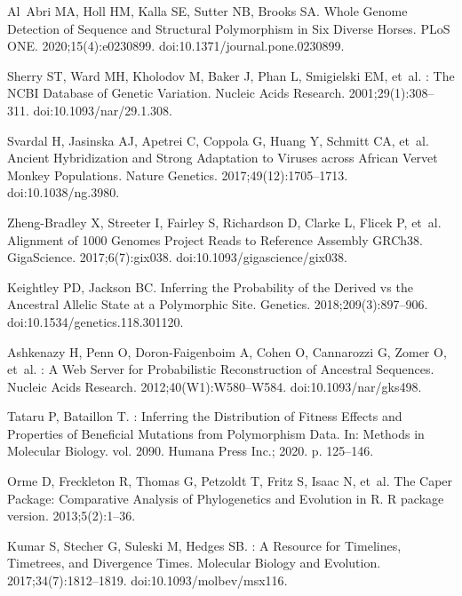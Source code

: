 \documentclass[10pt,letterpaper]{article}
\begin{document}
\begin{thebibliography}{10}
Al~Abri MA, Holl HM, Kalla SE, Sutter NB, Brooks SA.
\newblock Whole Genome Detection of Sequence and Structural Polymorphism in Six
Diverse Horses.
\newblock PLoS ONE. 2020;15(4):e0230899.
\newblock doi:{10.1371/journal.pone.0230899}.

Sherry ST, Ward MH, Kholodov M, Baker J, Phan L, Smigielski EM, et~al.
: The {{NCBI}} Database of Genetic Variation.
\newblock Nucleic Acids Research. 2001;29(1):308--311.
\newblock doi:{10.1093/nar/29.1.308}.

Svardal H, Jasinska AJ, Apetrei C, Coppola G, Huang Y, Schmitt CA, et~al.
\newblock Ancient Hybridization and Strong Adaptation to Viruses across
{{African}} Vervet Monkey Populations.
\newblock Nature Genetics. 2017;49(12):1705--1713.
\newblock doi:{10.1038/ng.3980}.

{Zheng-Bradley} X, Streeter I, Fairley S, Richardson D, Clarke L, Flicek P,
et~al.
\newblock Alignment of 1000 {{Genomes Project}} Reads to Reference Assembly
{{GRCh38}}.
\newblock GigaScience. 2017;6(7):gix038.
\newblock doi:{10.1093/gigascience/gix038}.

Keightley PD, Jackson BC.
\newblock Inferring the Probability of the Derived vs the Ancestral Allelic
State at a Polymorphic Site.
\newblock Genetics. 2018;209(3):897--906.
\newblock doi:{10.1534/genetics.118.301120}.

Ashkenazy H, Penn O, {Doron-Faigenboim} A, Cohen O, Cannarozzi G, Zomer O,
et~al.
: A Web Server for Probabilistic Reconstruction of
Ancestral Sequences.
\newblock Nucleic Acids Research. 2012;40(W1):W580--W584.
\newblock doi:{10.1093/nar/gks498}.

Tataru P, Bataillon T.
: {{Inferring}} the Distribution of Fitness Effects and
Properties of Beneficial Mutations from Polymorphism Data.
\newblock In: Methods in {{Molecular Biology}}. vol. 2090. Humana Press Inc.;
2020. p. 125--146.

Orme D, Freckleton R, Thomas G, Petzoldt T, Fritz S, Isaac N, et~al.
\newblock The Caper Package: Comparative Analysis of Phylogenetics and
Evolution in {{R}}.
\newblock R package version. 2013;5(2):1--36.

Kumar S, Stecher G, Suleski M, Hedges SB.
: A Resource for Timelines, Timetrees, and Divergence
Times.
\newblock Molecular Biology and Evolution. 2017;34(7):1812--1819.
\newblock doi:{10.1093/molbev/msx116}.

\end{thebibliography}
\end{document}

